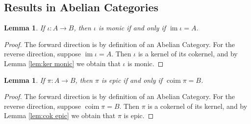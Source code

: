 \documentclass{article}
\DeclareMathOperator{\im}{im}
\DeclareMathOperator{\coim}{coim}
\newtheorem{lemma}[theorem]{Lemma}
\begin{document}
\subsection*{Results in Abelian Categories}
\begin{lemma}\label{lem:monic iff im is source}
    If $\iota:A\to B$, then $\iota$ is monic if and only if $\im \iota=A$.
\end{lemma}
\begin{proof}
    The forward direction is by definition of an Abelian Category. For the reverse direction, suppose $\im \iota=A$. Then $\iota$ is a kernel of its cokernel, and by Lemma \ref{lem:ker monic} we obtain that $\iota$ is monic.
\end{proof}
\begin{lemma}\label{lem:epic iff coim is target}
    If $\pi: A\to B$, then $\pi$ is epic if and only if $\coim \pi =B$.
\end{lemma}
\begin{proof}
    The forward direction is by definition of an Abelian Category. For the reverse direction, suppose $\coim \pi=B$. Then $\pi$ is a cokernel of its kernel, and by Lemma \ref{lem:cok epic} we obtain that $\pi$ is epic.
\end{proof}
\end{document}
